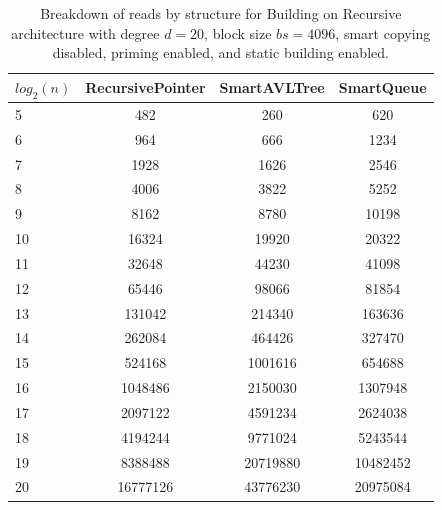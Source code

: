 \begin{table}[]
\centering
\begin{tabular}{|l|c|c|c|}
$log_2(n)$ & RecursivePointer & SmartAVLTree & SmartQueue \\ \hline
5 & 482 & 260 & 620 \\ \hline
6 & 964 & 666 & 1234 \\ \hline
7 & 1928 & 1626 & 2546 \\ \hline
8 & 4006 & 3822 & 5252 \\ \hline
9 & 8162 & 8780 & 10198 \\ \hline
10 & 16324 & 19920 & 20322 \\ \hline
11 & 32648 & 44230 & 41098 \\ \hline
12 & 65446 & 98066 & 81854 \\ \hline
13 & 131042 & 214340 & 163636 \\ \hline
14 & 262084 & 464426 & 327470 \\ \hline
15 & 524168 & 1001616 & 654688 \\ \hline
16 & 1048486 & 2150030 & 1307948 \\ \hline
17 & 2097122 & 4591234 & 2624038 \\ \hline
18 & 4194244 & 9771024 & 5243544 \\ \hline
19 & 8388488 & 20719880 & 10482452 \\ \hline
20 & 16777126 & 43776230 & 20975084 \\ \hline
\end{tabular}
\caption{Breakdown of reads by structure for Building on Recursive architecture with degree $d=20$, block size $bs=4096$, smart copying disabled, priming enabled, and static building enabled.}
    \label{tab:reads_by_structure_build_d20_bs4096_copiesfalse_primetrue_staticinsertiontrue_ptrecursive_movetrue}
\end{table}

